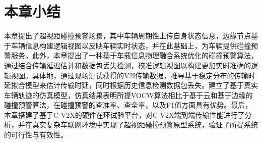 \section[\hspace{-2pt}本章小结]{{ \hspace{-8pt}本章小结}}\label{section 5-6}

本章提出了超视距碰撞预警场景，其中车辆周期性上传自身状态信息，边缘节点基于车辆信息构建逻辑视图以反映车辆实时状态，并在此基础上，为车辆提供碰撞预警服务。此外，本章提出了一种基于车载信息物理融合系统优化的碰撞预警算法，通过结合传输延迟估计和数据包丢失检测，校准逻辑视图以构建更加实时准确的逻辑视图。具体地，通过现场测试获得的V2I传输数据，推导基于稳定分布的传输时延拟合模型来估计传输时延，同时根据历史信息检测数据包丢失。建立了基于真实车辆轨迹的仿真模型，仿真结果表明所提VOCW算法相比于基于云和基于边缘的碰撞预警算法，在碰撞预警的查准率、查全率，以及F1值方面具有优势。最后，本章搭建了基于C-V2X的硬件在环试验平台，对C-V2X端到端传输性能进行了分析，并在真实复杂车联网环境中实现了超视距碰撞预警原型系统，验证了所提系统的可行性与有效性。